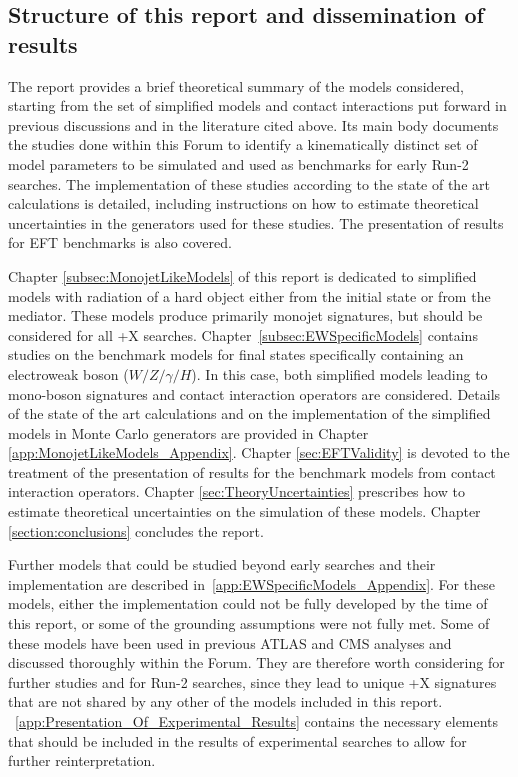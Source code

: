 \subsection{Structure of this report and dissemination of results}

The report provides a brief theoretical summary of the models considered, 
starting from the set of simplified models and contact interactions put forward 
in previous discussions and in the literature cited above. 
Its main body documents the studies 
done within this Forum to identify a kinematically distinct set of model parameters
to be simulated and used as benchmarks for early Run-2 searches. The implementation
of these studies according to the state of the art calculations is detailed,
including instructions on how to estimate theoretical uncertainties in the generators used
for these studies. The presentation of results for EFT benchmarks is also covered. 

Chapter \ref{subsec:MonojetLikeModels} of this report is dedicated to simplified
models with radiation of a hard object either from the initial state
or from the mediator. These models produce primarily monojet signatures, 
but should be considered for all \MET{}+X searches.
Chapter~\ref{subsec:EWSpecificModels} contains studies on the benchmark models
for final states specifically containing an electroweak 
boson ($W/Z/\gamma/H$). In this case, both 
simplified models leading to mono-boson signatures
and contact interaction operators are considered. 
Details of the state of the art calculations and on the implementation of the simplified models in
Monte Carlo generators are provided in
Chapter \ref{app:MonojetLikeModels_Appendix}.
Chapter \ref{sec:EFTValidity} is devoted to the treatment of the presentation of results for the benchmark
models from contact interaction operators. 
Chapter \ref{sec:TheoryUncertainties} prescribes how to estimate theoretical uncertainties on the simulation of these models. 
Chapter \ref{section:conclusions} concludes the report.

Further models that could be studied
beyond early searches and their implementation are described in~\ref{app:EWSpecificModels_Appendix}. 
For these models, either the implementation could not be fully developed by the time of this report,
or some of the grounding assumptions were not fully met.  
Some of these models have been used in previous ATLAS and CMS analyses and discussed thoroughly within the Forum. 
They are therefore worth considering for further studies and for Run-2 searches, since they lead to unique \MET{}+X signatures 
that are not shared by any other of the models included in this report. 
~\ref{app:Presentation_Of_Experimental_Results} contains the necessary elements that
should be included in the results of experimental searches to allow for further reinterpretation. 

